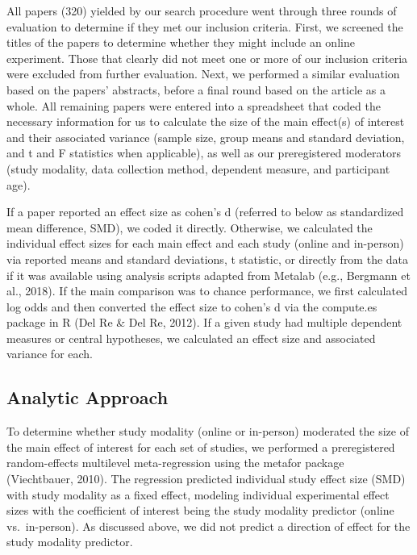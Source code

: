 \documentclass[
  man,floatsintext]{apa6}
\begin{document}
All papers (320) yielded by our search procedure went through three rounds of evaluation to determine if they met our inclusion criteria. First, we screened the titles of the papers to determine whether they might include an online experiment. Those that clearly did not meet one or more of our inclusion criteria were excluded from further evaluation. Next, we performed a similar evaluation based on the papers' abstracts, before a final round based on the article as a whole. All remaining papers were entered into a spreadsheet that coded the necessary information for us to calculate the size of the main effect(s) of interest and their associated variance (sample size, group means and standard deviation, and t and F statistics when applicable), as well as our preregistered moderators (study modality, data collection method, dependent measure, and participant age).

If a paper reported an effect size as cohen's d (referred to below as standardized mean difference, SMD), we coded it directly. Otherwise, we calculated the individual effect sizes for each main effect and each study (online and in-person) via reported means and standard deviations, t statistic, or directly from the data if it was available using analysis scripts adapted from Metalab (e.g., Bergmann et al., 2018). If the main comparison was to chance performance, we first calculated log odds and then converted the effect size to cohen's d via the compute.es package in R (Del Re \& Del Re, 2012). If a given study had multiple dependent measures or central hypotheses, we calculated an effect size and associated variance for each.

\hypertarget{analytic-approach}{%
\subsection{Analytic Approach}\label{analytic-approach}}

To determine whether study modality (online or in-person) moderated the size of the main effect of interest for each set of studies, we performed a preregistered random-effects multilevel meta-regression using the metafor package (Viechtbauer, 2010). The regression predicted individual study effect size (SMD) with study modality as a fixed effect, modeling individual experimental effect sizes with the coefficient of interest being the study modality predictor (online vs.~in-person). As discussed above, we did not predict a direction of effect for the study modality predictor.
\end{document}
